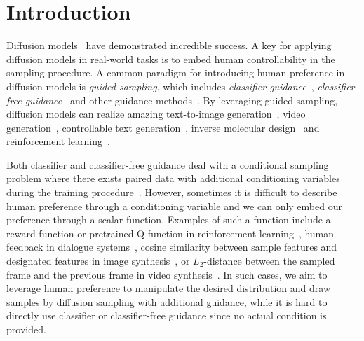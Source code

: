 \section{Introduction}











Diffusion models~\citep{sohl2015deep,ho2020denoising,song2020score,karras2022elucidating} have demonstrated incredible success.
A key for applying diffusion models in real-world tasks is to embed human controllability in the sampling procedure. A common paradigm for introducing human preference in diffusion models is \textit{guided sampling}, which includes \textit{classifier guidance}~\citep{diffusion_beat_gan}, \textit{classifier-free guidance}~\citep{ho2021classifier} and other guidance methods~\citep{nichol2021glide,ho2022video,zhao2022egsde}. By leveraging guided sampling, diffusion models can realize amazing text-to-image generation~\citep{saharia2022photorealistic}, video generation~\citep{ho2022video,ho2022imagen,yang2022diffusion,zhou2022magicvideo}, controllable text generation~\citep{li2022diffusion}, inverse molecular design~\citep{bao2022equivariant} and 
reinforcement learning~\citep{diffuser, sfbc, dd}.

Both classifier and classifier-free guidance deal with a conditional sampling problem where there exists paired data with additional conditioning variables during the training procedure~\citep{diffusion_beat_gan,graikos2022diffusion,rombach2022high}.
However, sometimes it is difficult to describe human preference through a conditioning variable and we can only embed our preference through a scalar function.
Examples of such a function include a reward function or pretrained Q-function in reinforcement learning~\citep{diffuser, sfbc}, human feedback in dialogue systems~\citep{ziegler2019fine}, cosine similarity between sample features and designated features in image synthesis~\citep{kwon2022diffusion}, or $L_2$-distance between the sampled frame and the previous frame in video synthesis~\citep{ho2022video}. In such cases, we aim to leverage human preference to manipulate the desired distribution and draw samples by diffusion sampling with additional guidance, while it is hard to directly use classifier or classifier-free guidance since no actual condition is provided.







